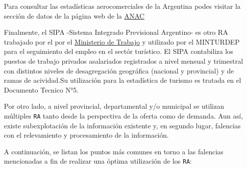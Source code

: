 \documentclass[
]{book}
\begin{document}
Para consultar las estadísticas aerocomerciales de la Argentina podes visitar la sección de datos de la página web de la \href{https://datos.anac.gob.ar/estadisticas/}{ANAC}

Finalmente, el SIPA -Sistema Integrado Previsional Argentino- es otro RA trabajado por el por el \href{http://www.trabajo.gob.ar/estadisticas/}{Ministerio de Trabajo} y utilizado por el MINTURDEP para el seguimiento del empleo en el sectór turístico. El SIPA contabiliza los puestos de trabajo privados asalariados registrados a nivel mensual y trimestral con distintos niveles de desagregación geográfica (nacional y provincial) y de ramas de acividad.Su utilización para la estadística de turismo es tratada en el Documento Tecnico N°5.

Por otro lado, a nivel provincial, departamental y/o municipal se utilizan múltiples \texttt{RA} tanto desde la perspectiva de la oferta como de demanda. Aun así, existe subexplotación de la información existente y, en segundo lugar, falencias con el relevamiento y procesamiento de la información.

A continuación, se listan los puntos más comunes en torno a las falencias mencionadas a fin de realizar una óptima utilización de los \texttt{RA}:
\end{document}
